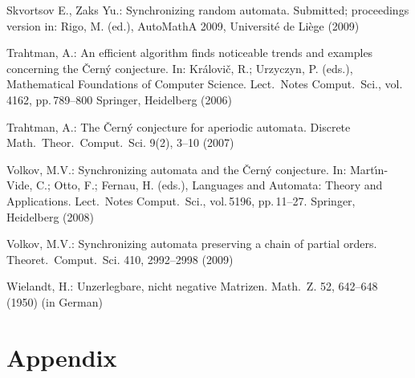 \documentclass[11pt]{llncs}
\begin{document}
\begin{thebibliography}{99}
Skvortsov E., Zaks Yu.: Synchronizing random automata. Submitted;
proceedings version in: Rigo, M. (ed.), AutoMathA 2009, Universit\'e
de Li\`ege (2009)

Trahtman, A.: An efficient algorithm finds noticeable trends
and examples concerning the \v{C}ern\'y conjecture. In:
Kr\'alovi\v{c}, R.; Urzyczyn, P. (eds.), Mathematical Foundations
of Computer Science. Lect.\ Notes Comput.\ Sci., vol.\,4162, pp.\,789--800
Springer, Heidelberg (2006)

Trahtman, A.: The \v{C}ern\'y conjecture for aperiodic automata.
Discrete Math.\ Theor.\ Comput.\ Sci. 9(2), 3--10 (2007)

Volkov, M.V.: Synchronizing automata and the \v{C}ern\'{y}
conjecture. In: Mart\'\i{}n-Vide, C.; Otto, F.; Fernau, H. (eds.),
Languages and Automata: Theory and Applications. Lect.\ Notes
Comput.\ Sci., vol.\,5196, pp.\,11--27.  Springer, Heidelberg (2008)

Volkov, M.V.: Synchronizing automata preserving a chain of partial
orders. Theoret.\ Comput.\ Sci. 410, 2992--2998 (2009)

Wielandt, H.: Unzerlegbare, nicht negative Matrizen. Math.\ Z.
52, 642--648 (1950) (in German)
\end{thebibliography}


\section*{Appendix}
\end{document}
